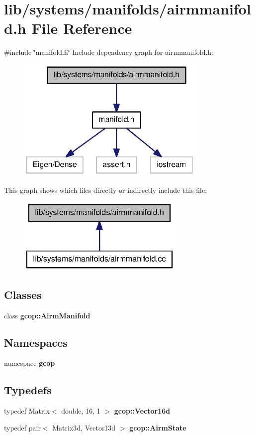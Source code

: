 \section{lib/systems/manifolds/airmmanifold.h \-File \-Reference}
\label{airmmanifold_8h}
{\ttfamily \#include \char`\"{}manifold.\-h\char`\"{}}\*
\-Include dependency graph for airmmanifold.\-h\-:\nopagebreak
\begin{figure}[H]
\begin{center}
\leavevmode
\includegraphics[width=258pt]{airmmanifold_8h__incl}
\end{center}
\end{figure}
\-This graph shows which files directly or indirectly include this file\-:\nopagebreak
\begin{figure}[H]
\begin{center}
\leavevmode
\includegraphics[width=228pt]{airmmanifold_8h__dep__incl}
\end{center}
\end{figure}
\subsection*{\-Classes}
\begin{DoxyCompactItemize}
\item 
class {\bf gcop\-::\-Airm\-Manifold}
\end{DoxyCompactItemize}
\subsection*{\-Namespaces}
\begin{DoxyCompactItemize}
\item 
namespace {\bf gcop}
\end{DoxyCompactItemize}
\subsection*{\-Typedefs}
\begin{DoxyCompactItemize}
\item 
typedef \-Matrix$<$ double, 16, 1 $>$ {\bf gcop\-::\-Vector16d}
\item 
typedef pair$<$ \-Matrix3d, \-Vector13d $>$ {\bf gcop\-::\-Airm\-State}
\end{DoxyCompactItemize}
